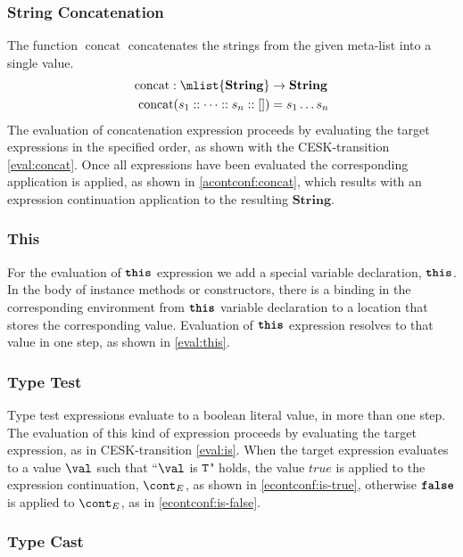\documentclass[a4paper,oneside,fleqn]{article}
\DeclareMathOperator{\concat}{concat}
\newcommand{\synt}[1]{\ensuremath{\text{\textbf{\texttt{#1}}}}}
\newcommand{\false}{\synt{false}}
\newcommand{\this}{\synt{this}}
\newcommand{\dsemstring}{\mathbf{String}}
\begin{document}
\subsubsection{String Concatenation}
\label{subsubsec:string-concatenation}

The function $\concat$ concatenates the strings from the given meta-list into a single value.
\begin{align*}
  \concat : \mlist{\dsemstring} &\rightarrow \dsemstring\\
  \concat( s_1 :: \dots :: s_n :: []) &= s_1 \dots s_n
\end{align*}
The evaluation of concatenation expression proceeds by evaluating the target expressions in the specified order, as shown with the CESK-transition \eqref{eval:concat}.
Once all expressions have been evaluated the corresponding application is applied, as shown in \eqref{acontconf:concat}, which results with an expression continuation application to the resulting $\dsemstring$.


\subsubsection{This}

For the evaluation of $\this$ expression we add a special variable declaration, $\this$.
In the body of instance methods or constructors, there is a binding in the corresponding environment from $\this$ variable declaration to a location that stores the corresponding value.
Evaluation of $\this$ expression resolves to that value in one step, as shown in \eqref{eval:this}.


\subsubsection{Type Test}
\label{subsubsec:type-test}

Type test expressions evaluate to a boolean literal value, in more than one step.
The evaluation of this kind of expression proceeds by evaluating the target expression, as in CESK-transition \eqref{eval:is}.
When the target expression evaluates to a value $\val$ such that ``$\val $ is $\tt{T}$" holds, the value $true$ is applied to the expression continuation, $\econt$, as shown in \eqref{econtconf:is-true}, otherwise $\false$ is applied to $\econt$, as in \eqref{econtconf:is-false}.


\subsubsection{Type Cast}
\label{subsubsec:type-cast}
\end{document}
